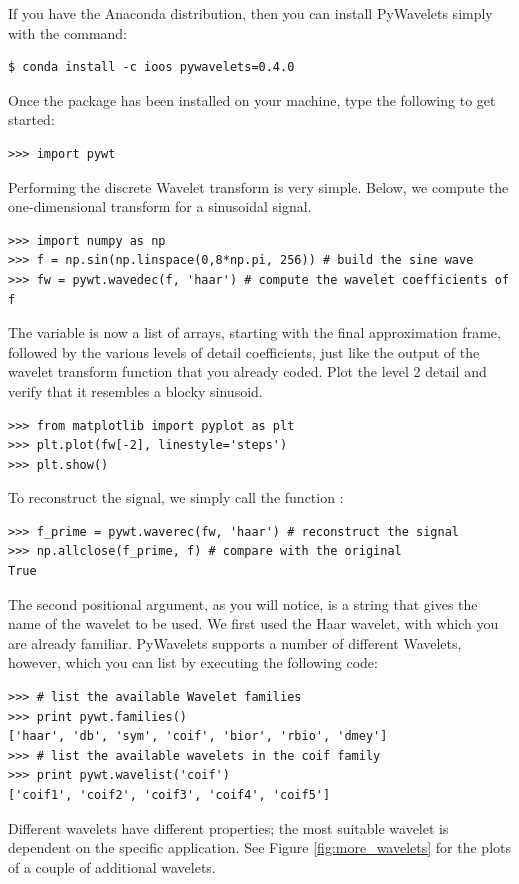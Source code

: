 If you have the Anaconda distribution, then you can install PyWavelets simply with the command:
\begin{lstlisting}
$ conda install -c ioos pywavelets=0.4.0
\end{lstlisting}
Once the package has been installed on your machine, type the following to get started:
\begin{lstlisting}
>>> import pywt
\end{lstlisting}
Performing the discrete Wavelet transform is very simple.
Below, we compute the one-dimensional transform for a sinusoidal signal.
\begin{lstlisting}
>>> import numpy as np
>>> f = np.sin(np.linspace(0,8*np.pi, 256)) # build the sine wave
>>> fw = pywt.wavedec(f, 'haar') # compute the wavelet coefficients of f
\end{lstlisting}
The variable  is now a list of arrays, starting with the final approximation
frame, followed by the various levels of detail coefficients, just like the output
of the wavelet transform function that you already coded.
Plot the level 2 detail and verify that it resembles a blocky sinusoid.
\begin{lstlisting}
>>> from matplotlib import pyplot as plt
>>> plt.plot(fw[-2], linestyle='steps')
>>> plt.show()
\end{lstlisting}
To reconstruct the signal, we simply call the function :
\begin{lstlisting}
>>> f_prime = pywt.waverec(fw, 'haar') # reconstruct the signal
>>> np.allclose(f_prime, f) # compare with the original
True
\end{lstlisting}
The second positional argument, as you will notice, is a string that gives the name of the wavelet to be used.
We first used the Haar wavelet, with which you are already familiar.
PyWavelets supports a number of different Wavelets, however, which you can list by executing the following code:
\begin{lstlisting}
>>> # list the available Wavelet families
>>> print pywt.families()
['haar', 'db', 'sym', 'coif', 'bior', 'rbio', 'dmey']
>>> # list the available wavelets in the coif family
>>> print pywt.wavelist('coif')
['coif1', 'coif2', 'coif3', 'coif4', 'coif5']
\end{lstlisting}
Different wavelets have different properties; the most suitable wavelet is dependent on the specific application.
See Figure \ref{fig:more_wavelets} for the plots of a couple of additional wavelets.

